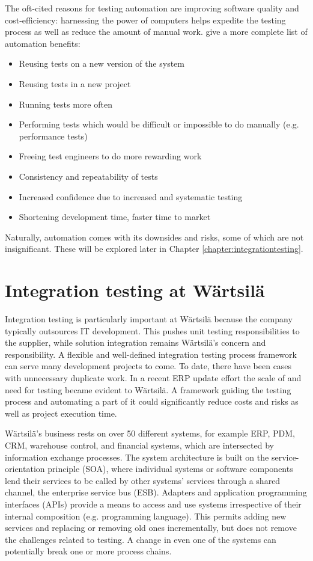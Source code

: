 \documentclass[12pt,a4paper,oneside,pdftex]{report}
\begin{document}
The oft-cited reasons for testing automation are improving software quality and cost-efficiency: harnessing the power of computers helps expedite the testing process as well as reduce the amount of manual work. \citet{fewster1999software} give a more complete list of automation benefits: %

\begin{itemize}
\item Reusing tests on a new version of the system
\item Reusing tests in a new project
\item Running tests more often
\item Performing tests which would be difficult or impossible to do manually (e.g. performance tests)
\item Freeing test engineers to do more rewarding work
\item Consistency and repeatability of tests
\item Increased confidence due to increased and systematic testing
\item Shortening development time, faster time to market
\end{itemize}

Naturally, automation comes with its downsides and risks, some of which are not insignificant. These will be explored later in Chapter \ref{chapter:integrationtesting}. %

\section{Integration testing at Wärtsilä}

Integration testing is particularly important at Wärtsilä because the company typically outsources IT development. This pushes unit testing responsibilities to the supplier, while solution integration remains Wärtsilä's concern and responsibility. A flexible and well-defined integration testing process framework can serve many development projects to come. To date, there have been cases with unnecessary duplicate work. In a recent ERP update effort the scale of and need for testing became evident to Wärtsilä. A framework guiding the testing process and automating a part of it could significantly reduce costs and risks as well as project execution time.

Wärtsilä's business rests on over 50 different systems, for example ERP, PDM, CRM, warehouse control, and financial systems, which are intersected by information exchange processes. The system architecture is built on the service-orientation principle (SOA), where individual systems or software components lend their services to be called by other systems' services through a shared channel, the enterprise service bus (ESB). Adapters and application programming interfaces (APIs) provide a means to access and use systems irrespective of their internal composition (e.g. programming language). This permits adding new services and replacing or removing old ones incrementally, but does not remove the challenges related to testing. A change in even one of the systems can potentially break one or more process chains. 
\end{document}
